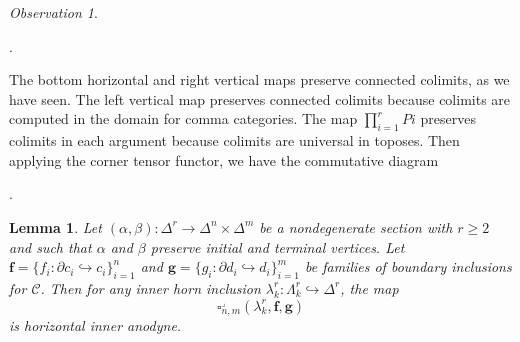 \documentclass[leqno]{article}
\numberwithin{equation}{subsection}
\theoremstyle{plain}   %
\newtheorem{lemma}[equation]{Lemma}
\theoremstyle{remark}
\newtheorem{obs}[equation]{Observation}
\theoremstyle{plain}
\DeclareMathOperator{\id}{id}
\newcommand{\overcat}[2]{{\left(#1\downarrow #2\right)}}
\newcommand{\psh}[1]{\ensuremath{\widehat{#1}}}
\providecommand{\C}{}
\renewcommand{\C}{\ensuremath{\mathcal{C}}}
\newcommand{\cellset}{\ensuremath{\widehat{\Theta[\mathcal{C}]}}}
\begin{document}
\begin{obs}
\begin{center}
.
	\end{center}
	The bottom horizontal and right vertical maps preserve connected colimits, as we have seen.  The left vertical map preserves connected colimits because colimits are computed in the domain for comma categories.  The map \(\prod_{i=1}^r Pi\) preserves colimits in each argument because colimits are universal in toposes. 
	Then applying the corner tensor functor, we have the commutative diagram
	\begin{center}
		.
	\end{center}
\end{obs}
\begin{lemma}\label{anodynelemma}
	Let \((\alpha,\beta): \Delta^r \to \Delta^n\times \Delta^m\) be a nondegenerate section with \(r\geq 2\) and such that \(\alpha\) and \(\beta\) preserve initial and terminal vertices. Let \(\mathbf{f}=\{f_i:\partial c_i \hookrightarrow c_i\}_{i=1}^n\) and \(\mathbf{g}=\{g_i:\partial d_i \hookrightarrow d_i\}_{i=1}^m\) be families of boundary inclusions for \(\C\).  Then for any inner horn inclusion \(\lambda^r_k: \Lambda^r_k\hookrightarrow \Delta^r\), the map
	\[
		\square^\lrcorner_{n,m}(\lambda^r_k, \mathbf{f},\mathbf{g})
	\]
	is horizontal inner anodyne.
\end{lemma}
\end{document}
